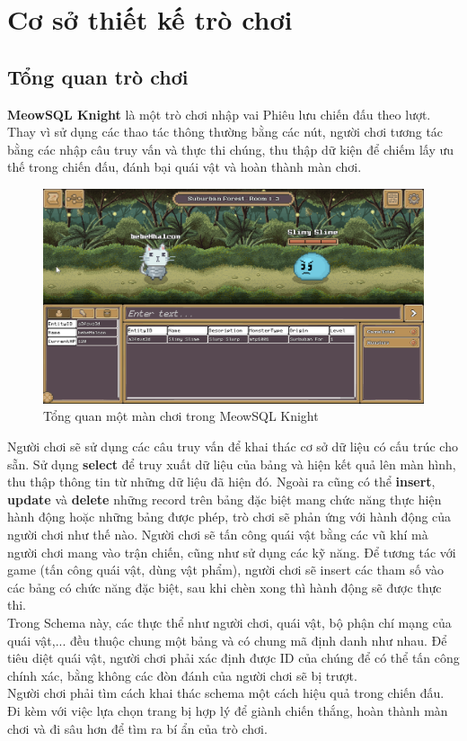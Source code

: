 \section{Cơ sở thiết kế trò chơi}
\subsection{Tổng quan trò chơi}
\hspace*{0.5cm} \textbf{MeowSQL Knight} là một trò chơi nhập vai Phiêu lưu chiến đấu theo lượt. Thay vì sử dụng các thao tác thông thường bằng các nút, người chơi tương tác bằng các nhập câu truy vấn và thực thi chúng, thu thập dữ kiện để chiếm lấy ưu thế trong chiến đấu, đánh bại quái vật và hoàn thành màn chơi.\\
\begin{figure}[H]
	\centering
	\includegraphics[width=\textwidth]{Images/Overall.png}
	\vspace{0.5cm}
	\caption{Tổng quan một màn chơi trong MeowSQL Knight}
\end{figure}
\hspace*{0.5cm} Người chơi sẽ sử dụng các câu truy vấn để khai thác cơ sở dữ liệu có cấu trúc cho sẵn. Sử dụng \textbf{select} để truy xuất dữ liệu của bảng và hiện kết quả lên màn hình, thu thập thông tin từ những dữ liệu đã hiện đó. Ngoài ra cũng có thể \textbf{insert}, \textbf{update} và \textbf{delete} những record trên bảng đặc biệt mang chức năng thực hiện hành động hoặc những bảng được phép, trò chơi sẽ phản ứng với hành động của người chơi như thế nào. Người chơi sẽ tấn công quái vật bằng các vũ khí mà người chơi mang vào trận chiến, cũng như sử dụng các kỹ năng. Để tương tác với game (tấn công quái vật, dùng vật phẩm), người chơi sẽ insert các tham số vào các bảng có chức năng đặc biệt, sau khi chèn xong thì hành động sẽ được thực thi.\\
\hspace*{0.5cm} Trong Schema này, các thực thể như người chơi, quái vật, bộ phận chí mạng của quái vật,... đều thuộc chung một bảng và có chung mã định danh như nhau. Để tiêu diệt quái vật, người chơi phải xác định được ID của chúng để có thể tấn công chính xác, bằng không các đòn đánh của người chơi sẽ bị trượt.\\
\hspace*{0.5cm} Người chơi phải tìm cách khai thác schema một cách hiệu quả trong chiến đấu. Đi kèm với việc lựa chọn trang bị hợp lý để giành chiến thắng, hoàn thành màn chơi và đi sâu hơn để tìm ra bí ẩn của trò chơi.


